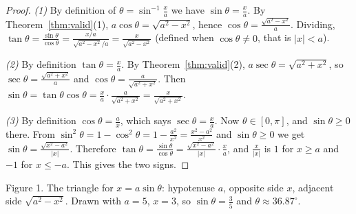 \documentclass[11pt]{article}
\begin{document}
\begin{proof}
\emph{(1)} By definition of $\theta=\sin^{-1}\frac xa$ we have $\sin\theta=\frac xa$. By Theorem~\ref{thm:valid}(1), $a\cos\theta=\sqrt{a^2-x^2}$, hence $\cos\theta=\frac{\sqrt{a^2-x^2}}a$. Dividing, $\tan\theta=\frac{\sin\theta}{\cos\theta}=\frac{x/a}{\sqrt{a^2-x^2}/a}=\frac x{\sqrt{a^2-x^2}}$ (defined when $\cos\theta\ne0$, that is $\lvert x\rvert<a$).

\emph{(2)} By definition $\tan\theta=\frac xa$. By Theorem~\ref{thm:valid}(2), $a\sec\theta=\sqrt{a^2+x^2}$, so $\sec\theta=\frac{\sqrt{a^2+x^2}}a$ and $\cos\theta=\frac a{\sqrt{a^2+x^2}}$. Then $\sin\theta=\tan\theta\cos\theta=\frac xa\cdot\frac a{\sqrt{a^2+x^2}}=\frac x{\sqrt{a^2+x^2}}$.

\emph{(3)} By definition $\cos\theta=\frac ax$, which says $\sec\theta=\frac xa$. Now $\theta\in[0,\pi]$, and $\sin\theta\ge0$ there. From $\sin^2\theta=1-\cos^2\theta=1-\frac{a^2}{x^2}=\frac{x^2-a^2}{x^2}$ and $\sin\theta\ge0$ we get $\sin\theta=\frac{\sqrt{x^2-a^2}}{\lvert x\rvert}$. Therefore $\tan\theta=\frac{\sin\theta}{\cos\theta}=\frac{\sqrt{x^2-a^2}}{\lvert x\rvert}\cdot\frac xa$, and $\frac x{\lvert x\rvert}$ is $1$ for $x\ge a$ and $-1$ for $x\le-a$. This gives the two signs.
\end{proof}

\begin{center}
\end{center}
\begin{center}\small Figure 1. The triangle for $x=a\sin\theta$: hypotenuse $a$, opposite side $x$, adjacent side $\sqrt{a^2-x^2}$. Drawn with $a=5$, $x=3$, so $\sin\theta=\frac35$ and $\theta\approx36.87^\circ$.\end{center}
\end{document}
